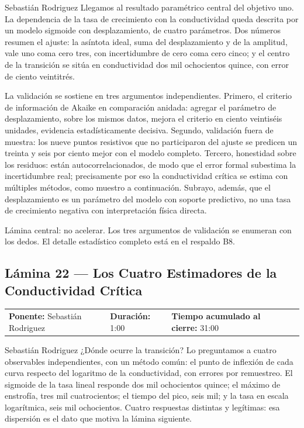 \documentclass[11pt,letterpaper]{article}
\makeatletter
\newcommand{\lamina}[5]{%
  \subsection*{Lámina #1 --- #2}
  \noindent
  \begin{tabular}{@{}llll@{}}
    \textbf{Ponente:} #3 &\quad \textbf{Duración:} #4 &\quad
    \textbf{Tiempo acumulado al cierre:} #5 &
  \end{tabular}
  \vspace{2pt}}
\makeatother
\begin{document}
\begin{parlamento}{Sebastián Rodriguez}
Llegamos al resultado paramétrico central del objetivo uno. La dependencia
de la tasa de crecimiento con la conductividad queda descrita por un modelo
sigmoide con desplazamiento, de cuatro parámetros. Dos números resumen el
ajuste: la asíntota ideal, suma del desplazamiento y de la amplitud, vale
uno coma cero tres, con incertidumbre de cero coma cero cinco; y el centro
de la transición se sitúa en conductividad dos mil ochocientos quince, con
error de ciento veintitrés.

La validación se sostiene en tres argumentos independientes. Primero, el
criterio de información de Akaike en comparación anidada: agregar el
parámetro de desplazamiento, sobre los mismos datos, mejora el criterio en
ciento veintiséis unidades, evidencia estadísticamente decisiva. Segundo,
validación fuera de muestra: los nueve puntos resistivos que no
participaron del ajuste se predicen un treinta y seis por ciento mejor con
el modelo completo. Tercero, honestidad sobre los residuos: están
autocorrelacionados, de modo que el error formal subestima la incertidumbre
real; precisamente por eso la conductividad crítica se estima con múltiples
métodos, como muestro a continuación. Subrayo, además, que el
desplazamiento es un parámetro del modelo con soporte predictivo, no una
tasa de crecimiento negativa con interpretación física directa.
\end{parlamento}

\begin{indicaciones}
Lámina central: no acelerar. Los tres argumentos de validación se enumeran
con los dedos. El detalle estadístico completo está en el respaldo B8.
\end{indicaciones}

\lamina{22}{Los Cuatro Estimadores de la Conductividad Crítica}{Sebastián Rodriguez}{1:00}{31:00}

\begin{parlamento}{Sebastián Rodriguez}
¿Dónde ocurre la transición? Lo preguntamos a cuatro observables
independientes, con un método común: el punto de inflexión de cada curva
respecto del logaritmo de la conductividad, con errores por remuestreo. El
sigmoide de la tasa lineal responde dos mil ochocientos quince; el máximo
de enstrofía, tres mil cuatrocientos; el tiempo del pico, seis mil; y la
tasa en escala logarítmica, seis mil ochocientos. Cuatro respuestas
distintas y legítimas: esa dispersión es el dato que motiva la lámina
siguiente.
\end{parlamento}
\end{document}

